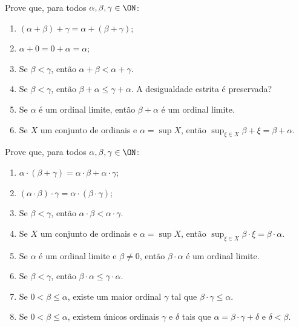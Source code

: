 \begin{exercise}
    Prove que, para todos $\alpha, \beta, \gamma \in \ON$:
    \begin{enumerate}[label=(\alph*)]
        \item $(\alpha+\beta)+\gamma=\alpha+(\beta+\gamma)$;
        \item $\alpha+0=0+\alpha=\alpha$;
        \item Se $\beta<\gamma$, então $\alpha+\beta<\alpha+\gamma$.
        \item Se $\beta<\gamma$, então $\beta+\alpha\leq \gamma+\alpha$.
        A desigualdade estrita é preservada?
        \item Se $\alpha$ é um ordinal limite, então $\beta+\alpha$ é um ordinal limite.
        \item Se $X$ um conjunto de ordinais e $\alpha=\sup X$, então $\sup_{\xi \in X}\beta+\xi=\beta+\alpha$.
    \end{enumerate}
\end{exercise}

\begin{exercise}
    Prove que, para todos $\alpha, \beta, \gamma \in \ON$:
    \begin{enumerate}[label=(\alph*)]
        \item $\alpha\cdot (\beta+\gamma)=\alpha\cdot \beta+\alpha\cdot \gamma$;
        \item $(\alpha\cdot \beta)\cdot \gamma=\alpha\cdot (\beta\cdot \gamma)$;
        \item Se $\beta<\gamma$, então $\alpha\cdot \beta<\alpha\cdot \gamma$.
        \item Se $X$ um conjunto de ordinais e $\alpha=\sup X$, então $\sup_{\xi \in X}\beta\cdot \xi=\beta\cdot \alpha$.
        \item Se $\alpha$ é um ordinal limite e $\beta\neq 0$, então $\beta\cdot \alpha$ é um ordinal limite.
        \item Se $\beta<\gamma$, então $\beta\cdot \alpha\leq \gamma\cdot \alpha$.
        \item Se $0<\beta\leq\alpha$, existe um maior ordinal $\gamma$ tal que $\beta\cdot \gamma\leq \alpha$.
        \item Se $0<\beta\leq\alpha$, existem únicos ordinais $\gamma$ e $\delta$ tais que $\alpha=\beta\cdot \gamma+\delta$ e $\delta<\beta$.
    \end{enumerate}
\end{exercise}

